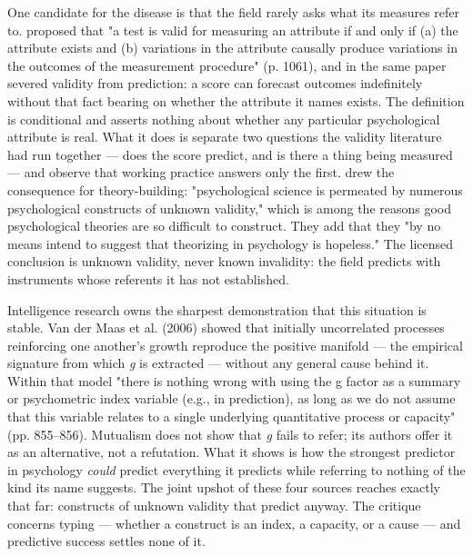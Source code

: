 \documentclass[12pt,a4paper]{article}
\begin{document}
One candidate for the disease is that the field rarely asks what its measures refer to. \citet{Borsboom2004} proposed that "a test is valid for measuring an attribute if and only if (a) the attribute exists and (b) variations in the attribute causally produce variations in the outcomes of the measurement procedure" (p. 1061), and in the same paper severed validity from prediction: a score can forecast outcomes indefinitely without that fact bearing on whether the attribute it names exists. The definition is conditional and asserts nothing about whether any particular psychological attribute is real. What it does is separate two questions the validity literature had run together ---\hspace{0pt} does the score predict, and is there a thing being measured ---\hspace{0pt} and observe that working practice answers only the first. \citet{EronenBringmann2021} drew the consequence for theory-building: "psychological science is permeated by numerous psychological constructs of unknown validity," which is among the reasons good psychological theories are so difficult to construct. They add that they "by no means intend to suggest that theorizing in psychology is hopeless." The licensed conclusion is unknown validity, never known invalidity: the field predicts with instruments whose referents it has not established.

Intelligence research owns the sharpest demonstration that this situation is stable. Van der Maas et al. (2006) showed that initially uncorrelated processes reinforcing one another's growth reproduce the positive manifold ---\hspace{0pt} the empirical signature from which \emph{g} is extracted ---\hspace{0pt} without any general cause behind it. Within that model "there is nothing wrong with using the g factor as a summary or psychometric index variable (e.g., in prediction), as long as we do not assume that this variable relates to a single underlying quantitative process or capacity" (pp. 855--856). Mutualism does not show that \emph{g} fails to refer; its authors offer it as an alternative, not a refutation. What it shows is how the strongest predictor in psychology \emph{could} predict everything it predicts while referring to nothing of the kind its name suggests. The joint upshot of these four sources reaches exactly that far: constructs of unknown validity that predict anyway. The critique concerns typing ---\hspace{0pt} whether a construct is an index, a capacity, or a cause ---\hspace{0pt} and predictive success settles none of it.
\end{document}
